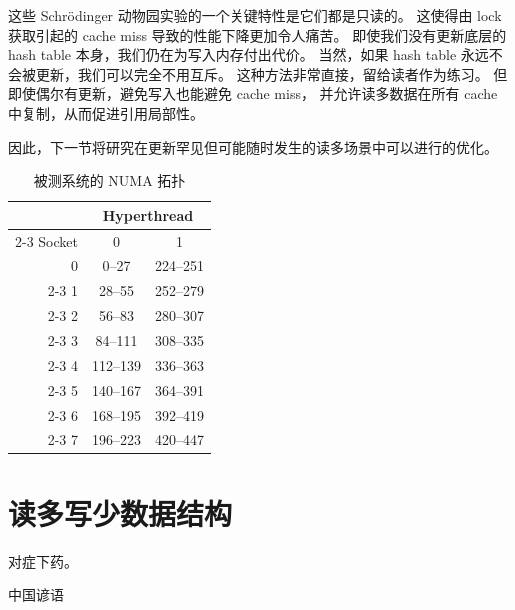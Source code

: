 \QuickQuizEnd

这些 Schr\"odinger 动物园实验的一个关键特性是它们都是只读的。
这使得由 lock 获取引起的 cache miss 导致的性能下降更加令人痛苦。
即使我们没有更新底层的 hash table 本身，我们仍在为写入内存付出代价。
当然，如果 hash table 永远不会被更新，我们可以完全不用互斥。
这种方法非常直接，留给读者作为练习。
但即使偶尔有更新，避免写入也能避免 cache miss，
并允许读多数据在所有 cache 中复制，从而促进引用局部性。

因此，下一节将研究在更新罕见但可能随时发生的读多场景中可以进行的优化。

\begin{table}
\renewcommand*{\arraystretch}{1.2}
\centering
\begin{tabular}{r||c|c}
	& \multicolumn{2}{c}{Hyperthread} \\
	\cline{2-3}
	Socket & 0 &  1 \\
	\hline
	\hline
	0 &    0--27 & 224--251 \\
	\cline{2-3}
	1 &   28--55 & 252--279 \\
	\cline{2-3}
	2 &   56--83 & 280--307 \\
	\cline{2-3}
	3 &  84--111 & 308--335 \\
	\cline{2-3}
	4 & 112--139 & 336--363 \\
	\cline{2-3}
	5 & 140--167 & 364--391 \\
	\cline{2-3}
	6 & 168--195 & 392--419 \\
	\cline{2-3}
	7 & 196--223 & 420--447 \\
\end{tabular}
\caption{被测系统的 NUMA 拓扑}
\label{fig:datastruct:NUMA Topology of System Under Test}
\end{table}

\section{读多写少数据结构}
\label{sec:datastruct:Read-Mostly Data Structures}
%
\epigraph{对症下药。}{中国谚语}

